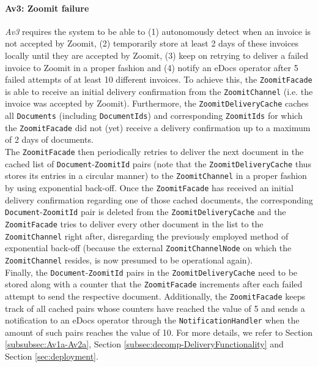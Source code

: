 \documentclass[a4paper,10pt]{article}
\begin{document}
\paragraph{Av3: Zoomit failure}
\textit{Av3} requires the system to be able to (1) autonomously detect when an invoice is not accepted by Zoomit, (2) temporarily store at least 2 days of these invoices locally until they are accepted by Zoomit, (3) keep on retrying to deliver a failed invoice to Zoomit in a proper fashion and (4) notify an eDocs operator after 5 failed attempts of at least 10 different invoices. To achieve this, the \texttt{ZoomitFacade} is able to receive an initial delivery confirmation from the \texttt{ZoomitChannel} (i.e. the invoice was accepted by Zoomit). Furthermore, the \texttt{ZoomitDeliveryCache} caches all \texttt{Documents} (including \texttt{DocumentIds}) and corresponding \texttt{ZoomitIds} for which the \texttt{ZoomitFacade} did not (yet) receive a delivery confirmation up to a maximum of 2 days of documents.\\
The \texttt{ZoomitFacade} then periodically retries to deliver the next document in the cached list of \texttt{Document}-\texttt{ZoomitId} pairs (note that the \texttt{ZoomitDeliveryCache} thus stores its entries in a circular manner) to the \texttt{ZoomitChannel} in a proper fashion by using exponential back-off. Once the \texttt{ZoomitFacade} has received an initial delivery confirmation regarding one of those cached documents, the corresponding \texttt{Document}-\texttt{ZoomitId} pair is deleted from the \texttt{ZoomitDeliveryCache} and the \texttt{ZoomitFacade} tries to deliver every other document in the list to the \texttt{ZoomitChannel} right after, disregarding the previously employed method of exponential back-off (because the external \texttt{ZoomitChannelNode} on which the \texttt{ZoomitChannel} resides, is now presumed to be operational again).\\
Finally, the \texttt{Document}-\texttt{ZoomitId} pairs in the \texttt{ZoomitDeliveryCache} need to be stored along with a counter that the \texttt{ZoomitFacade} increments after each failed attempt to send the respective document. Additionally, the \texttt{ZoomitFacade} keeps track of all cached pairs whose counters have reached the value of 5 and sends a notification to an eDocs operator through the \texttt{NotificationHandler} when the amount of such pairs reaches the value of 10.
For more details, we refer to Section \ref{subsubsec:Av1a-Av2a}, Section \ref{subsec:decomp-DeliveryFunctionality} and Section \ref{sec:deployment}.
\end{document}
